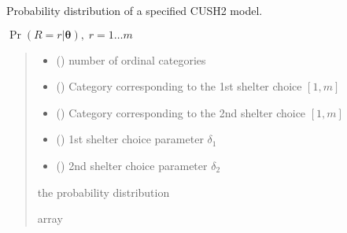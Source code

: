 \documentclass[letterpaper,10pt,english]{sphinxmanual}
\begin{document}
\begin{fulllineitems}
\label{\detokenize{cubmods:cubmods.cush2.pmf}}
\pysigstartsignatures
{}
\pysigstopsignatures
\sphinxAtStartPar
Probability distribution of a specified CUSH2 model.

\sphinxAtStartPar
\(\Pr(R = r | \pmb\theta),\; r=1 \ldots m\)
\begin{quote}\begin{description}
\begin{itemize}
\item {} 
\sphinxAtStartPar
{} () \textendash{} number of ordinal categories

\item {} 
\sphinxAtStartPar
{} () \textendash{} Category corresponding to the 1st shelter choice \([1,m]\)

\item {} 
\sphinxAtStartPar
{} () \textendash{} Category corresponding to the 2nd shelter choice \([1,m]\)

\item {} 
\sphinxAtStartPar
{} () \textendash{} 1st shelter choice parameter \(\delta_1\)

\item {} 
\sphinxAtStartPar
{} () \textendash{} 2nd shelter choice parameter \(\delta_2\)

\end{itemize}

\sphinxAtStartPar
the probability distribution

\sphinxAtStartPar
array

\end{description}\end{quote}

\end{fulllineitems}
\end{document}
